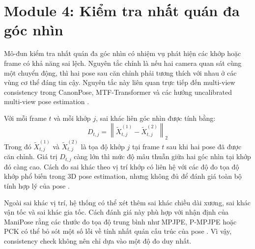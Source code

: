 \documentclass[../DoAn.tex]{subfiles}
\begin{document}
\section{Module 4: Kiểm tra nhất quán đa góc nhìn}
\label{sec:consistency_check}

Mô-đun kiểm tra nhất quán đa góc nhìn có nhiệm vụ phát hiện các khớp hoặc frame có khả năng sai lệch. Nguyên tắc chính là nếu hai camera quan sát cùng một chuyển động, thì hai pose sau căn chỉnh phải tương thích với nhau ở các vùng cơ thể đáng tin cậy. Nguyên tắc này liên quan trực tiếp đến multi-view consistency trong CanonPose, MTF-Transformer và các hướng uncalibrated multi-view pose estimation \cite{canonpose2021,mtftransformer2023,probtriangulation2023}.

Với mỗi frame $t$ và mỗi khớp $j$, sai khác liên góc nhìn được tính bằng:
\[
D_{t,j} = \left\| \tilde{X}^{(1)}_{t,j} - \tilde{X}^{(2)}_{t,j} \right\|_2
\]
Trong đó $\tilde{X}^{(1)}_{t,j}$ và $\tilde{X}^{(2)}_{t,j}$ là tọa độ khớp $j$ tại frame $t$ sau khi hai pose đã được căn chỉnh. Giá trị $D_{t,j}$ càng lớn thì mức độ mâu thuẫn giữa hai góc nhìn tại khớp đó càng cao. Cách đo sai khác theo vị trí khớp có liên hệ với các độ đo tọa độ khớp phổ biến trong 3D pose estimation, nhưng không đủ để đánh giá toàn bộ tính hợp lý của pose \cite{manipose2024}.

Ngoài sai khác vị trí, hệ thống có thể xét thêm sai khác chiều dài xương, sai khác vận tốc và sai khác gia tốc. Cách đánh giá này phù hợp với nhận định của ManiPose rằng các thước đo tọa độ trung bình như MPJPE, P-MPJPE hoặc PCK có thể bỏ sót một số lỗi về tính nhất quán cấu trúc của pose \cite{manipose2024}. Vì vậy, consistency check không nên chỉ dựa vào một độ đo duy nhất.
\end{document}
